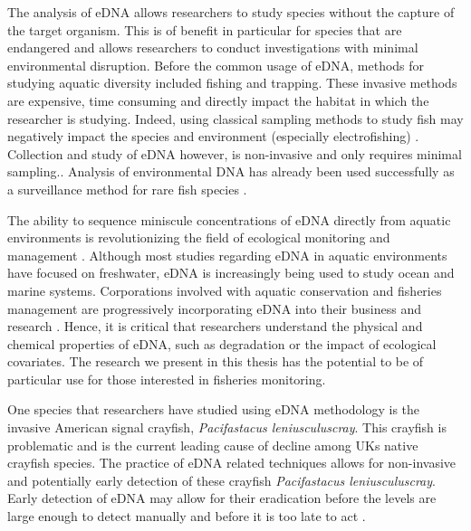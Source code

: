 \vspace{5mm}




The analysis of eDNA allows researchers to study species without the capture of the target organism. This is of benefit in particular for species that are endangered and allows researchers to conduct investigations with minimal environmental disruption. Before the common usage of eDNA, methods for studying aquatic diversity included fishing and trapping. These invasive methods are expensive, time consuming and directly impact the habitat in which the researcher is studying. Indeed, using classical sampling methods to study fish may negatively impact the species and environment (especially electrofishing) \citep{electrofishing,freshwaterbiodiversity}. Collection and study of eDNA however, is non-invasive and only requires minimal sampling.\citep{ednaPH,streamdwelling}. Analysis of environmental DNA has already been used successfully as a surveillance method for rare fish species \citep{rareaquatic}.


\vspace{5mm}

The ability to sequence miniscule concentrations of eDNA directly from aquatic environments is revolutionizing the field of ecological monitoring and management \citep{MarineSystems}. Although most studies regarding eDNA in aquatic environments have focused on freshwater, eDNA is increasingly being used to study ocean and marine systems.  Corporations involved with aquatic conservation and fisheries management are progressively incorporating eDNA into their business and research \citep{usesofedna}. Hence, it is critical that researchers understand the physical and chemical properties of eDNA, such as degradation or the impact of ecological covariates. The research we present in this thesis has the potential to be of particular use for those interested in fisheries monitoring. 


   \vspace{4mm}


One species that researchers have studied using eDNA methodology is the invasive American signal crayfish, \textit{Pacifastacus leniusculuscray}. This crayfish is problematic and is the current leading cause of decline among UK\textsc{}s native crayfish species. The practice of eDNA related techniques allows for non-invasive and potentially early detection of these crayfish \textit{Pacifastacus leniusculuscray}. Early detection of eDNA may allow for their eradication before the levels are large enough to detect manually and before it is too late to act \citep{crayfish}.

